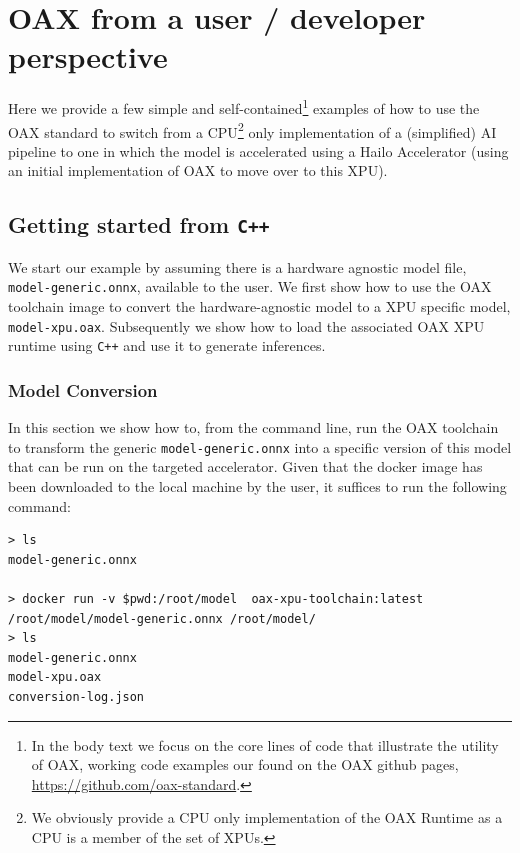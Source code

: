 \documentclass{article}
\newcommand{\oaxgit}{\href{https://github.com/oax-standard}{https://github.com/oax-standard}}
\begin{document}
\section{OAX from a user / developer perspective}

Here we provide a few simple and self-contained\footnote{In the body text we focus on the core lines of code that illustrate the utility of OAX, working code examples our found on the OAX github pages, \oaxgit.} examples of how to use the OAX standard to switch from a CPU\footnote{We obviously provide a CPU only implementation of the OAX Runtime as a CPU is a member of the set of XPUs.} only implementation of a (simplified) AI pipeline to one in which the model is accelerated using a Hailo Accelerator (using an initial implementation of OAX to move over to this XPU). %

\subsection{Getting started from \texttt{C++}}

We start our example by assuming there is a hardware agnostic model file, \texttt{model-generic.onnx}, available to the user. We first show how to use the OAX toolchain image to convert the hardware-agnostic model to a XPU specific model, \texttt{model-xpu.oax}. Subsequently we show how to load the associated OAX XPU runtime using \texttt{C++} and use it to generate inferences.

\subsubsection{Model Conversion}

In this section we show how to, from the command line, run the OAX toolchain to transform the generic \texttt{model-generic.onnx} into a specific version of this model that can be run on the targeted accelerator. Given that the docker image has been downloaded to the local machine by the user, it suffices to run the following command:

\begin{lstlisting}
> ls
model-generic.onnx

> docker run -v $pwd:/root/model  oax-xpu-toolchain:latest /root/model/model-generic.onnx /root/model/
> ls
model-generic.onnx
model-xpu.oax
conversion-log.json
\end{lstlisting}
\end{document}
